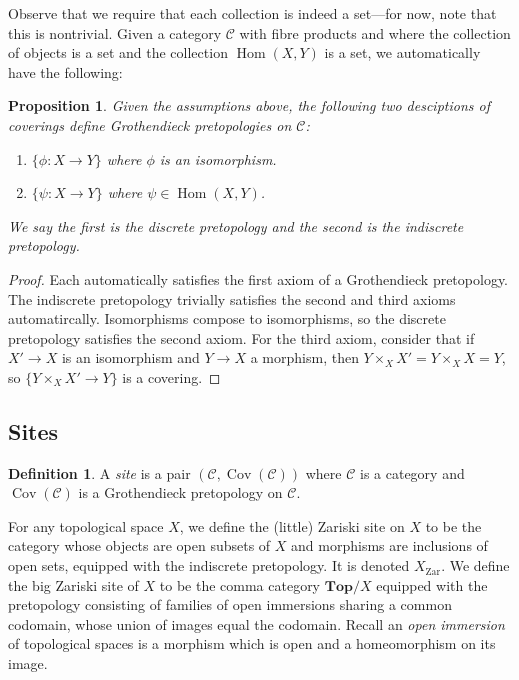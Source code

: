 \documentclass{amsart}
\newcommand{\Top}{\mathbf{Top}}
\DeclareMathOperator{\Cov}{Cov}
\DeclareMathOperator{\Hom}{Hom}
\newtheorem{proposition}[theorem]{Proposition}
\theoremstyle{definition}
\newtheorem{definition}[theorem]{Definition}
\theoremstyle{remark}
\begin{document}
Observe that we require that each collection is indeed a set---for now, note
that this is nontrivial. Given a category $\mathcal{C}$ with fibre products and
where the collection of objects is a set and the collection $\Hom(X, Y)$ is a
set, we automatically have the following:

\begin{proposition}
    Given the assumptions above, the following two desciptions of coverings
    define Grothendieck pretopologies on $\mathcal{C}$:
    \begin{enumerate}
        \item $\{\phi : X \to Y\}$ where $\phi$ is an isomorphism.

        \item $\{\psi : X \to Y\}$ where $\psi \in \Hom(X, Y)$.
    \end{enumerate}
    We say the first is the \textit{discrete} pretopology and the second is the
    \textit{indiscrete} pretopology.
\end{proposition}

\begin{proof}
    Each automatically satisfies the first axiom of a Grothendieck pretopology.
    The indiscrete pretopology trivially satisfies the second and third axioms
    automatircally. Isomorphisms compose to isomorphisms, so the discrete
    pretopology satisfies the second axiom. For the third axiom, consider that
    if $X' \to X$ is an isomorphism and $Y \to X$ a morphism, then $Y \times_X
    X' = Y \times_X X = Y$, so $\{Y \times_X X' \to Y\}$ is a covering.
\end{proof}

\subsection{Sites}

\begin{definition}
    A \textit{site} is a pair $(\mathcal{C}, \Cov(\mathcal{C}))$ where
    $\mathcal{C}$ is a category and $\Cov(\mathcal{C})$ is a Grothendieck
    pretopology on $\mathcal{C}$.
\end{definition}

For any topological space $X$, we define the (little) Zariski site on $X$ to be the
category whose objects are open subsets of $X$ and morphisms are inclusions of
open sets, equipped with the indiscrete pretopology. It is denoted
$X_{\text{Zar}}$. We define the big Zariski site of $X$ to be the comma category
$\Top/X$ equipped with the pretopology consisting of families of open immersions
sharing a common codomain, whose union of images equal the codomain. Recall an
\textit{open immersion} of topological spaces is a morphism which is open and a
homeomorphism on its image.
\end{document}
